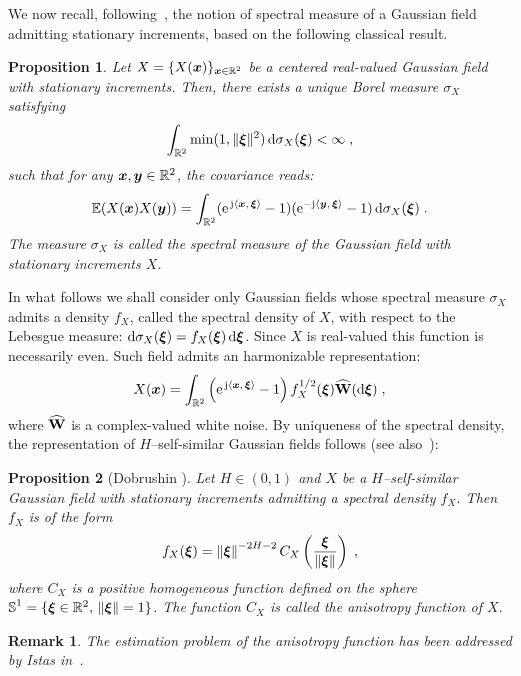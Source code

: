 \documentclass{elsarticle}
\newtheorem{proposition}{Proposition}
\newtheorem{remark}{Remark}
\def\S{\mbox{$\mathbb{S}$}}
\def\vx{\vect{x}}
\begin{document}
We now recall, following~\cite{yaglom1957some}, the notion of spectral measure of a Gaussian field admitting stationary increments, based on the following classical result.
\begin{proposition}\label{prop:borel}
Let $X=\{X(\bm{x})\}_{\bm{x}\in \mathbb{R}^2}$ be a centered real-valued Gaussian field with stationary increments. Then, there exists a unique Borel measure $\sigma_X$ satisfying
\[
\int_{\mathbb{R}^2} \min(1, \|\vect{\xi}\|^2)\dif \sigma_X(\vect{\xi})<\infty\;,
\] 
such that for any $\bm{x},\bm{y}\in \mathbb{R}^2$, the covariance reads:
\[
\mathbb{E}(X(\vect{x})X(\vect{y}))=\int_{\mathbb{R}^2}(\expj{\ip{\vect{x}}{\vect{\xi}}}-1)(\eu^{-\jj \ip{\vect{y}}{\vect{\xi}}}-1)\dif \sigma_X(\vect{\xi})\;.
\]
The measure $\sigma_X$ is called the spectral measure of the Gaussian field with stationary increments $X$.
\end{proposition}
%
In what follows we shall consider only Gaussian fields whose spectral measure $\sigma_X$ admits a density $f_X$, called the spectral density of $X$, with respect to the Lebesgue measure: $\dif \sigma_X(\vect{\xi})=f_X(\vect{\xi}) \dif \vect{\xi} $. Since $X$ is real-valued this function is necessarily even. Such field admits an harmonizable representation:
\begin{equation}
\label{eq:harmonizable}
X(\vx)=\int_{\mathbb{R}^2}\left(\expj{\ip{\vect{x}}{\vect{\xi}}}-1\right)f_X^{1/2}(\vect{\xi})\widehat{\ope{W}}(\diff \vect{\xi})\;,
\end{equation}
where $\widehat{\mathbf{W}}$ is a complex-valued white noise.
By uniqueness of the spectral density, the representation of $H$--self-similar Gaussian fields follows (see also~\cite{Do79, BJR97, bonami2003anisotropic, cohen2013fractional}):
%
\begin{proposition}[Dobrushin \cite{Do79}]\label{pro:spectral-density-ss}
Let $H\in (0,1)$ and $X$ be a $H$--self-similar Gaussian field with stationary increments admitting a spectral density $f_X$. Then $f_X$ is of the form
\[
f_X(\bm{\xi})=\left\lVert\bm{\xi}\right\rVert^{-2H-2} C_X\left(\frac{\bm{\xi}}{\left\lVert\bm{\xi}\right\rVert}\right)\;,
\]
where $C_X$ is a positive homogeneous function defined on the sphere $\S^{1}=\{\vect{\xi}\in\mathbb{R}^2,\,\norme{\vect{\xi}}=1\}$. The function $C_X$ is called the anisotropy function of $X$.
\end{proposition}
\begin{remark}
The estimation problem of the anisotropy function has been addressed by Istas in~\cite{Ist07}.
\end{remark} 
\end{document}
